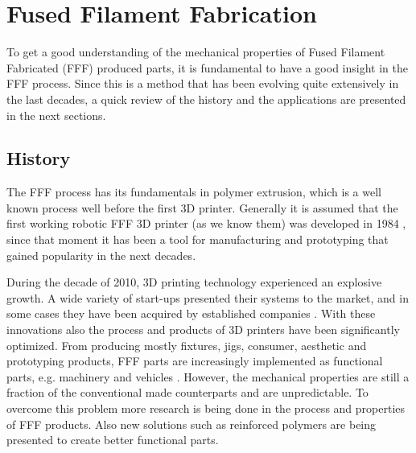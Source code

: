\section{Fused Filament Fabrication}
    \label{Fused Filament Fabrication}

To get a good understanding of the mechanical properties of Fused Filament Fabricated (FFF) produced parts, it is fundamental to have a good insight in the FFF process. Since this is a method that has been evolving quite extensively in the last decades, a quick review of the history and the applications are presented in the next sections. 

\subsection{History}
    \label{History}
The FFF process has its fundamentals in polymer extrusion, which is a well known process well before the first 3D printer. Generally it is assumed that the first working robotic FFF 3D printer (as we know them) was developed in 1984 , since that moment it has been a tool for manufacturing and prototyping that gained popularity in the next decades. 

During the decade of 2010, 3D printing technology experienced an explosive growth. A wide variety of start-ups presented their systems to the market, and in some cases they have been acquired by established companies \cite{Kamran2016ATechnology}. With these innovations also the process and products of 3D printers have been significantly optimized. From producing mostly fixtures, jigs, consumer, aesthetic and prototyping products, FFF parts are increasingly implemented as functional parts, e.g. machinery and vehicles . However, the mechanical properties are still a fraction of the conventional made counterparts and are unpredictable. To overcome this problem more research is being done in the process and properties of FFF products. Also new solutions such as reinforced polymers are being presented to create better functional parts. 

